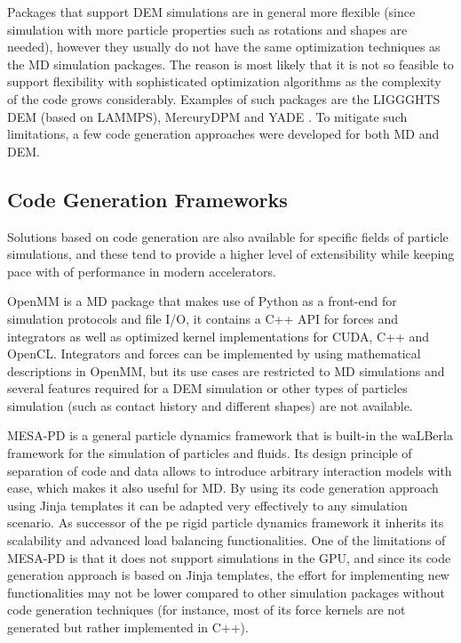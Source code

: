 \documentclass[preprint,12pt]{elsarticle}
\begin{document}
Packages that support DEM simulations are in general more flexible (since simulation with more particle properties such as rotations and shapes are needed), however they usually do not have the same optimization techniques as the MD simulation packages.
The reason is most likely that it is not so feasible to support flexibility with sophisticated optimization algorithms as the complexity of the code grows considerably.
Examples of such packages are the LIGGGHTS DEM \cite{liggghts} (based on LAMMPS), MercuryDPM \cite{mercurydpm} and YADE \cite{yade}.
To mitigate such limitations, a few code generation approaches were developed for both MD and DEM.

\subsection{Code Generation Frameworks}
\label{sec:codegen}


Solutions based on code generation are also available for specific fields of particle simulations, and these tend to provide a higher level of extensibility while keeping pace with of performance in modern accelerators.

OpenMM \cite{openmm} is a \ac{MD} package that makes use of Python as a front-end for simulation protocols and file I/O, it contains a C++ API for forces and integrators as well as optimized kernel implementations for CUDA, C++ and OpenCL.
Integrators and forces can be implemented by using mathematical descriptions in OpenMM, but its use cases are restricted to \ac{MD} simulations and several features required for a DEM simulation or other types of particles simulation (such as contact history and different shapes) are not available.

MESA-PD \cite{mesapd3} is a general particle dynamics framework that is built-in the waLBerla framework for the simulation of particles and fluids.
Its design principle of separation of code and data allows to introduce arbitrary interaction models with ease, which makes it also useful for \ac{MD}.
By using its code generation approach using Jinja templates it can be adapted very effectively to any simulation scenario.
As successor of the pe rigid particle dynamics framework it inherits its scalability and advanced load balancing functionalities.
One of the limitations of MESA-PD is that it does not support simulations in the GPU, and since its code generation approach is based on Jinja templates, the effort for implementing new functionalities may not be lower compared to other simulation packages without code generation techniques (for instance, most of its force kernels are not generated but rather implemented in C++).
\end{document}
